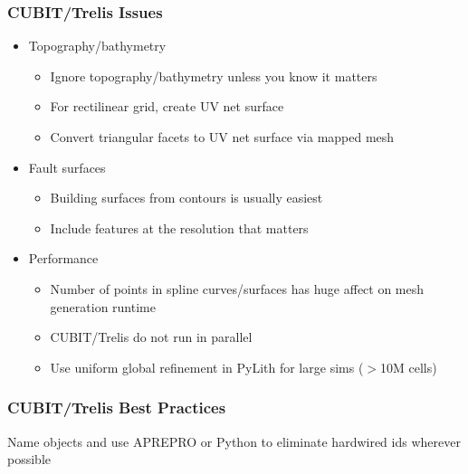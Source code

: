 \documentclass[aspectratio=169]{beamer}
\begin{document}
\begin{frame}
  \frametitle{CUBIT/Trelis Issues}
 
  \begin{itemize}
  \item Topography/bathymetry
    \begin{itemize}
    \item Ignore topography/bathymetry unless you know it matters
    \item For rectilinear grid, create UV net surface
    \item Convert triangular facets to UV net surface via mapped mesh
    \end{itemize}
  \item Fault surfaces
    \begin{itemize}
    \item Building surfaces from contours is usually easiest
    \item Include features at the resolution that matters
    \end{itemize}
  \item Performance
    \begin{itemize}
    \item Number of points in spline curves/surfaces has huge affect
      on mesh generation runtime
    \item CUBIT/Trelis do not run in parallel
    \item Use uniform global refinement in PyLith for large sims ($>$10M cells) 
    \end{itemize}
  \end{itemize}

\end{frame}


\begin{frame}
  \frametitle{CUBIT/Trelis Best Practices}
  \summary{}
 
  \begin{description}
     {Name objects and use
      APREPRO or Python to eliminate hardwired ids wherever possible}
  \end{description}

\end{frame}
\end{document}
